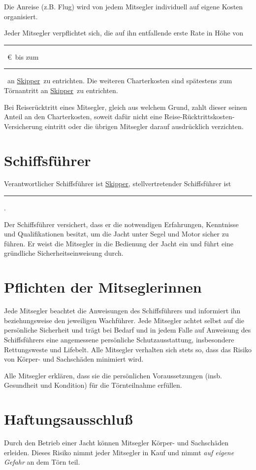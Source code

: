 \documentclass[a4paper,12pt]{article}
\newcommand{\openlength}[1]{\rule{#1}{.4pt}}
\newcommand{\openeuro}{\openlength{2cm}~\euro}
\newcommand{\open}{\openlength{3cm}}
\newcommand{\skipper}{\underline{Skipper}}
\newcommand{\coskipper}{\open}
\newcommand{\paydate}{\open}
\begin{document}
Die Anreise (z.B. Flug) wird von jedem Mitsegler individuell auf eigene Kosten organisiert.

Jeder Mitsegler verpflichtet sich, die auf ihn entfallende erste Rate in Höhe von \openeuro\ bis zum \paydate\ an \skipper\ zu entrichten.
Die weiteren Charterkosten sind spätestens zum Törnantritt an \skipper\ zu entrichten.

Bei Reiserücktritt eines Mitsegler, gleich aus welchem Grund, zahlt dieser seinen Anteil an den Charterkosten, soweit dafür nicht eine Reise-Rücktrittskosten-Versicherung eintritt oder die übrigen Mitsegler darauf ausdrücklich verzichten.


\section{Schiffsführer}
\label{sec:Skipper}

Verantwortlicher Schiffsführer ist \skipper, stellvertretender Schiffsführer ist \coskipper.

Der Schiffsführer versichert, dass er die notwendigen Erfahrungen, Kenntnisse und Qualifikationen besitzt, um die Jacht unter Segel und Motor sicher zu führen.
Er weist die Mitsegler in die Bedienung der Jacht ein und führt eine gründliche Sicherheitseinweisung durch.


\section{Pflichten der Mitseglerinnen}
\label{sec:Pflichten}

Jede Mitsegler beachtet die Anweisungen des Schiffsführers und informiert ihn beziehungsweise den jeweiligen Wachführer.
Jede Mitsegler achtet selbst auf die persönliche Sicherheit und trägt bei Bedarf und in jedem Falle auf Anweisung des Schiffsführers eine angemessene persönliche Schutzausstattung, insbesondere Rettungsweste und Lifebelt.
Alle Mitsegler verhalten sich stets so, dass das Risiko von Körper- und Sachschäden minimiert wird.

Alle Mitsegler erklären, dass sie die persönlichen Voraussetzungen (insb. Gesundheit und Kondition) für die Törnteilnahme erfüllen.


\section{Haftungsausschluß}
\label{sec:Haftung}

Durch den Betrieb einer Jacht können Mitsegler Körper- und Sachschäden erleiden.
Dieses Risiko nimmt jeder Mitsegler in Kauf und nimmt \textit{auf eigene Gefahr} an dem Törn teil.
\end{document}
